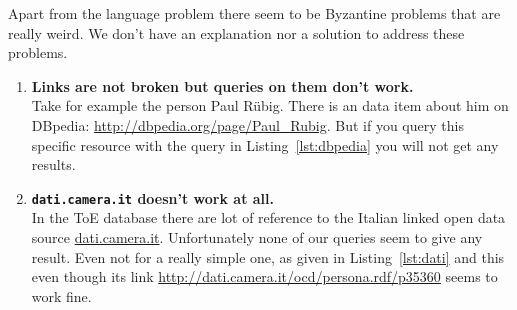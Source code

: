 Apart from the language problem there seem to be Byzantine problems that are really weird. We don't have an explanation nor a solution to address these problems.

\begin{enumerate}
\item \textbf{Links are not broken but queries on them don't work.}\\
Take for example the person Paul R\"ubig. There is an data item about him on DBpedia: \url{http://dbpedia.org/page/Paul\_Rubig}. But if you query this specific resource with the query in Listing~\ref{lst:dbpedia} you will not get any results. 

\item \textbf{\texttt{dati.camera.it} doesn't work at all.}\\
In the ToE database there are lot of reference to the Italian linked open data source \url{dati.camera.it}. Unfortunately none of our queries seem to give any result. Even not for a really simple one, as given in Listing~\ref{lst:dati} and this even though its link \url{http://dati.camera.it/ocd/persona.rdf/p35360} seems to work fine.
\end{enumerate}




